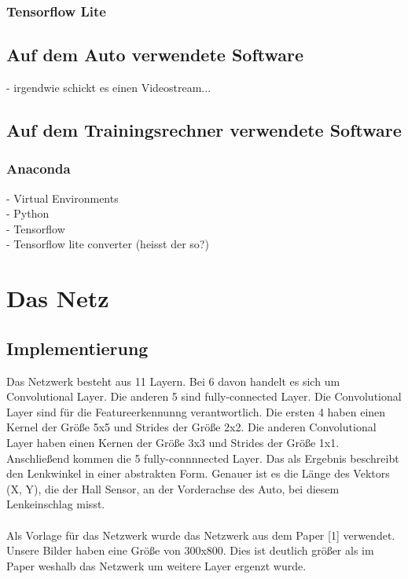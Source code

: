 \documentclass[a4paper, 12pt]{scrartcl}
\begin{document}
			\subsubsection{Tensorflow Lite}
			
			
			
		\subsection{Auf dem Auto verwendete Software}
		- irgendwie schickt es einen Videostream...
		\subsection{Auf dem Trainingsrechner verwendete Software}
			\subsubsection{Anaconda}
			- Virtual Environments \\
			- Python \\
			- Tensorflow \\
			- Tensorflow lite converter (heisst der so?) \\
			
		\section{Das Netz}
			\subsection{Implementierung}
			Das Netzwerk besteht aus 11 Layern. Bei 6 davon handelt es sich um Convolutional Layer. Die anderen 5 sind fully-connected Layer. Die Convolutional Layer sind für die Featureerkennunng verantwortlich. Die ersten 4 haben einen Kernel der Größe 5x5 und Strides der Größe 2x2. Die anderen Convolutional Layer haben einen Kernen der Größe 3x3 und Strides der Größe 1x1. Anschließend kommen die 5 fully-connnnected Layer. Das als Ergebnis beschreibt den Lenkwinkel in einer abstrakten Form. Genauer ist es die Länge des Vektors (X, Y), die der Hall Sensor, an der Vorderachse des Auto, bei diesem Lenkeinschlag misst.\\ \\
			Als Vorlage für das Netzwerk wurde das Netzwerk aus dem Paper [1] verwendet. Unsere Bilder haben eine Größe von 300x800. Dies ist deutlich größer als im Paper weshalb das Netzwerk um weitere Layer ergenzt wurde.
			
\end{document}
